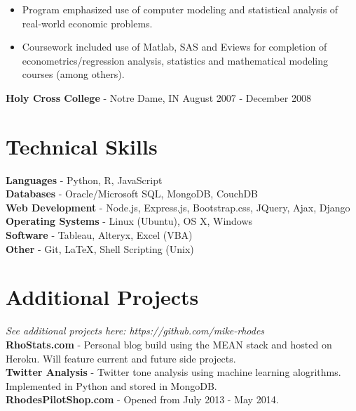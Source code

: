 \documentclass[margin]{res}
\begin{document}
\begin{resume}
\begin{itemize} \itemsep -2pt  %
	\item Program emphasized use of computer modeling and statistical analysis of real-world economic problems.
 	\item Coursework included use of Matlab, SAS and Eviews for completion of econometrics/regression analysis, statistics and mathematical modeling courses (among others).
\end{itemize}

\textbf{Holy Cross College} - Notre Dame, IN \hfill August 2007 - December 2008

 
\section{Technical Skills}
    {\bf Languages} - Python, R, JavaScript\\
	{\bf Databases} - Oracle/Microsoft SQL, MongoDB, CouchDB\\
	{\bf Web Development} - Node.js, Express.js, Bootstrap.css, JQuery, Ajax, Django\\
	{\bf Operating Systems} - Linux (Ubuntu), OS X, Windows\\
    {\bf Software} - Tableau, Alteryx, Excel (VBA)\\
    {\bf Other} - Git, {\LaTeX}, Shell Scripting (Unix)
    
\section{Additional Projects} \hfill \textit{See additional projects here: https://github.com/mike-rhodes}\\
	{\bf RhoStats.com} - Personal blog build using the MEAN stack and hosted on Heroku. Will feature current and future side projects.\\
	{\bf Twitter Analysis} - Twitter tone analysis using machine learning alogrithms. Implemented in Python and stored in MongoDB.\\
	{\bf RhodesPilotShop.com} - Opened from July 2013 - May 2014.
	
\end{resume}
\end{document}
